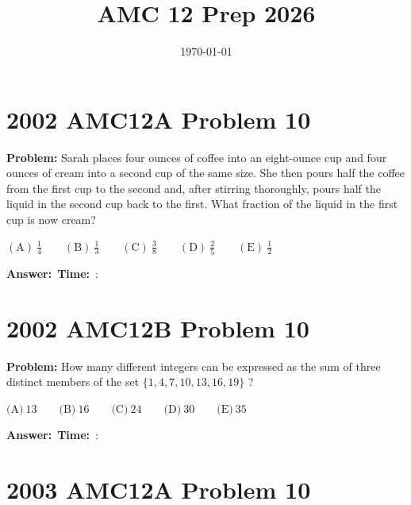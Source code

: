 \documentclass[12pt]{article}
\title{AMC 12 Prep 2026}
\author{}
\date{\today}
\begin{document}
\maketitle

\section{2002 AMC12A Problem 10}

\textbf{Problem:}
Sarah places four ounces of coffee into an eight-ounce cup and four ounces of cream into a second cup of the same size. She then pours half the coffee from the first cup to the second and, after stirring thoroughly, pours half the liquid in the second cup back to the first. What fraction of the liquid in the first cup is now cream?

$\mathrm{(A) \ } \frac{1}{4}\qquad \mathrm{(B) \ } \frac13\qquad \mathrm{(C) \ } \frac38\qquad \mathrm{(D) \ } \frac25\qquad \mathrm{(E) \ } \frac12$

\vspace{0.3cm}
\noindent\textbf{Answer:}~\underline{\hspace{5cm}}\hfill\textbf{Time:}~\underline{\hspace{1.2cm}}:\underline{\hspace{1.2cm}}

\vspace{0.5cm}

\section{2002 AMC12B Problem 10}

\textbf{Problem:}
How many different integers can be expressed as the sum of three distinct members of the set $\{1,4,7,10,13,16,19\}$ ?

$\text{(A)}\ 13 \qquad \text{(B)}\ 16 \qquad \text{(C)}\ 24 \qquad \text{(D)}\ 30 \qquad \text{(E)}\ 35$

\vspace{0.3cm}
\noindent\textbf{Answer:}~\underline{\hspace{5cm}}\hfill\textbf{Time:}~\underline{\hspace{1.2cm}}:\underline{\hspace{1.2cm}}

\vspace{0.5cm}

\section{2003 AMC12A Problem 10}
\end{document}
